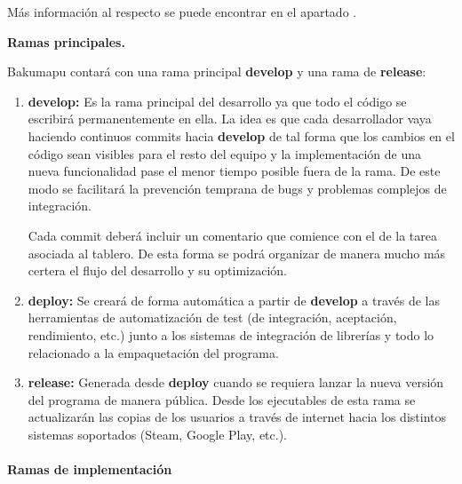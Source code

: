 Más información al respecto se puede encontrar en el apartado .


\noindent\textbf{Ramas principales.}\label{flujo:ramas-principales}

\noindent Bakumapu contará con una rama principal \textbf{develop} y una rama de \textbf{release}:

\begin{enumerate}
	\renewcommand{\labelenumi}{\alph{enumi}.}
	\item \textbf{develop:} Es la rama principal del desarrollo ya que todo el código se escribirá permanentemente en ella. La idea es que cada desarrollador vaya haciendo continuos commits hacia \textbf{develop} de tal forma que los cambios en el código sean visibles para el resto del equipo y la implementación de una nueva funcionalidad pase el menor tiempo posible fuera de la rama. De este modo se facilitará la prevención temprana de bugs y problemas complejos de integración.
	
	Cada commit deberá incluir un comentario que comience con el  de la tarea asociada al tablero. De esta forma se podrá organizar de manera mucho más certera el flujo del desarrollo y su optimización.
	
	\item \textbf{deploy:} Se creará de forma automática a partir de \textbf{develop} a través de las herramientas de automatización de test (de integración, aceptación, rendimiento, etc.) junto a los sistemas de integración de librerías y todo lo relacionado a la empaquetación del programa.
	
	\item \textbf{release:} Generada desde \textbf{deploy} cuando se requiera lanzar la nueva versión del programa de manera pública. Desde los ejecutables de esta rama se actualizarán las copias de los usuarios a través de internet hacia los distintos sistemas soportados (Steam, Google Play, etc.).
\end{enumerate}

\paragraph{Ramas de implementación}\label{pg:ramas-de-implementacion}

